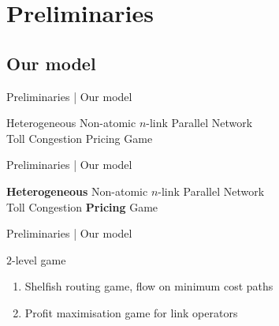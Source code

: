 \documentclass{beamer}
\begin{document}
\section{Preliminaries}

\subsection{Our model}

\begin{frame}{Preliminaries | Our model}
	\begin{center}
		Heterogeneous Non-atomic $n$-link Parallel Network\\
		Toll Congestion Pricing Game
	\end{center}
\end{frame}
\begin{frame}{Preliminaries | Our model}
	\begin{center}
		\textbf{Heterogeneous} Non-atomic $n$-link Parallel Network\\
		Toll Congestion \textbf{Pricing} Game
	\end{center}
\end{frame}

\begin{frame}{Preliminaries | Our model}
	\;
	\begin{block}{$2$-level game}
		\begin{enumerate}
			\item Shelfish routing game, flow on minimum cost paths
			\item Profit maximisation game for link operators
		\end{enumerate}
	\end{block}
\end{frame}
\end{document}

